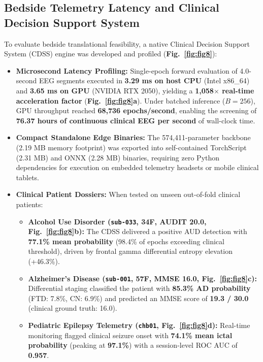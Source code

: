 \documentclass[11pt,a4paper]{article}
\begin{document}
\subsection{Bedside Telemetry Latency and Clinical Decision Support System}
To evaluate bedside translational feasibility, a native Clinical Decision Support System (CDSS) engine was developed and profiled (\textbf{Fig.~\ref{fig:fig8}}):
\begin{itemize}
    \item \textbf{Microsecond Latency Profiling:} Single-epoch forward evaluation of 4.0-second EEG segments executed in \textbf{3.29 ms on host CPU} (Intel x86\_64) and \textbf{3.65 ms on GPU} (NVIDIA RTX 2050), yielding a \textbf{1,058$\times$ real-time acceleration factor} (\textbf{Fig.~\ref{fig:fig8}a}). Under batched inference ($B=256$), GPU throughput reached \textbf{68,736 epochs/second}, enabling the screening of \textbf{76.37 hours of continuous clinical EEG per second} of wall-clock time.
    \item \textbf{Compact Standalone Edge Binaries:} The 574,411-parameter backbone (2.19 MB memory footprint) was exported into self-contained TorchScript (2.31 MB) and ONNX (2.28 MB) binaries, requiring zero Python dependencies for execution on embedded telemetry headsets or mobile clinical tablets.
    \item \textbf{Clinical Patient Dossiers:} When tested on unseen out-of-fold clinical patients:
    \begin{itemize}
        \item \textbf{Alcohol Use Disorder (\texttt{sub-033}, 34F, AUDIT 20.0, Fig.~\ref{fig:fig8}b):} The CDSS delivered a positive AUD detection with \textbf{77.1\% mean probability} (98.4\% of epochs exceeding clinical threshold), driven by frontal gamma differential entropy elevation (+46.3\%).
        \item \textbf{Alzheimer's Disease (\texttt{sub-001}, 57F, MMSE 16.0, Fig.~\ref{fig:fig8}c):} Differential staging classified the patient with \textbf{85.3\% AD probability} (FTD: 7.8\%, CN: 6.9\%) and predicted an MMSE score of \textbf{19.3 / 30.0} (clinical ground truth: 16.0).
        \item \textbf{Pediatric Epilepsy Telemetry (\texttt{chb01}, Fig.~\ref{fig:fig8}d):} Real-time monitoring flagged clinical seizure onset with \textbf{74.1\% mean ictal probability} (peaking at \textbf{97.1\%}) with a session-level ROC AUC of \textbf{0.957}.
    \end{itemize}
\end{itemize}
\end{document}
